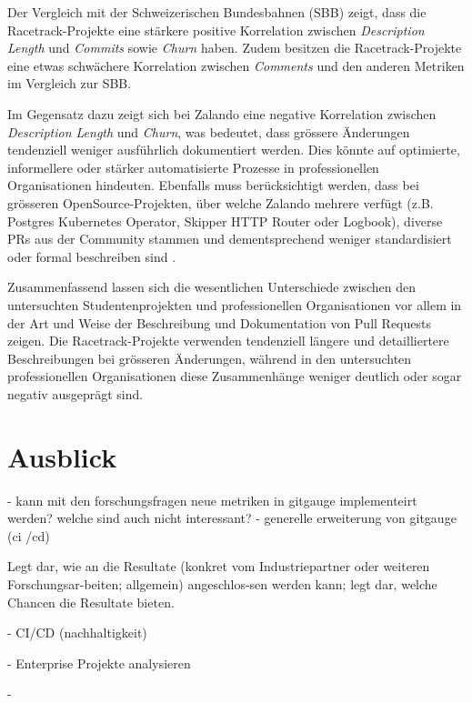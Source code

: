 Der Vergleich mit der Schweizerischen Bundesbahnen (SBB) zeigt, dass die Racetrack-Projekte eine stärkere positive Korrelation zwischen \textit{Description Length} und \textit{Commits} sowie \textit{Churn} haben. Zudem besitzen die Racetrack-Projekte eine etwas schwächere Korrelation zwischen \textit{Comments} und den anderen Metriken im Vergleich zur SBB.

Im Gegensatz dazu zeigt sich bei Zalando eine negative Korrelation zwischen \textit{Description Length} und \textit{Churn}, was bedeutet, dass grössere Änderungen tendenziell weniger ausführlich dokumentiert werden. Dies könnte auf optimierte, informellere oder stärker automatisierte Prozesse in professionellen Organisationen hindeuten. Ebenfalls muss berücksichtigt werden, dass bei grösseren OpenSource-Projekten, über welche Zalando mehrere verfügt (z.B. Postgres Kubernetes Operator, Skipper HTTP Router oder Logbook), diverse PRs aus der Community stammen und dementsprechend weniger standardisiert oder formal beschreiben sind \parencite{noauthor_zalandologbook_2025} \parencite{noauthor_zalandoskipper_2025} \parencite{noauthor_zalandopostgres-operator_2025}.

Zusammenfassend lassen sich die wesentlichen Unterschiede zwischen den untersuchten Studentenprojekten und professionellen Organisationen vor allem in der Art und Weise der Beschreibung und Dokumentation von Pull Requests zeigen. Die Racetrack-Projekte verwenden tendenziell längere und detailliertere Beschreibungen bei grösseren Änderungen, während in den untersuchten professionellen Organisationen diese Zusammenhänge weniger deutlich oder sogar negativ ausgeprägt sind.



\section{Ausblick}
- kann mit den forschungsfragen neue metriken in gitgauge implementeirt werden? welche sind auch nicht interessant?
- generelle erweiterung von gitgauge (ci /cd)

Legt dar, wie an die Resultate (konkret vom Industriepartner oder weiteren Forschungsar-beiten; allgemein) angeschlos-sen werden kann; legt dar, welche Chancen die Resultate bieten.

- CI/CD (nachhaltigkeit)

- Enterprise Projekte analysieren

- 



